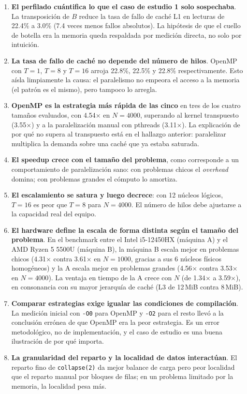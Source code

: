 \begin{enumerate}
    \item \textbf{El perfilado cuántifica lo que el caso de estudio 1 solo sospechaba}. La transposición de $B$ reduce la tasa de fallo de caché L1 en lecturas de 22.4\% a 3.0\% (7.4 veces menos fallos absolutos). La hipótesis de que el cuello de botella era la memoria queda respaldada por medición directa, no solo por intuición.

    \item \textbf{La tasa de fallo de caché no depende del número de hilos}. OpenMP con $T=1$, $T=8$ y $T=16$ arroja 22.8\%, 22.5\% y 22.8\% respectivamente. Esto aísla limpiamente la causa: el paralelismo no empeora el acceso a la memoria (el patrón es el mismo), pero tampoco lo arregla.

    \item \textbf{OpenMP es la estrategia más rápida de las cinco} en tres de los cuatro tamaños evaluados, con 4.54$\times$ en $N=4000$, superando al kernel transpuesto (3.55$\times$) y a la paralelización manual con pthreads (3.11$\times$). La explicación de por qué no supera al transpuesto está en el hallazgo anterior: paralelizar multiplica la demanda sobre una caché que ya estaba saturada.

    \item \textbf{El speedup crece con el tamaño del problema}, como corresponde a un comportamiento de paralelización sano: con problemas chicos el \emph{overhead} domina; con problemas grandes el cómputo lo amortiza.

    \item \textbf{El escalamiento se satura y luego decrece}: con 12 núcleos lógicos, $T=16$ es peor que $T=8$ para $N=4000$. El número de hilos debe ajustarse a la capacidad real del equipo.

    \item \textbf{El hardware define la escala de forma distinta según el tamaño del problema}. En el benchmark entre el Intel i5-12450HX (máquina A) y el AMD Ryzen 5 5500U (máquina B), la máquina B escala mejor en problemas chicos (4.31$\times$ contra 3.61$\times$ en $N=1000$, gracias a sus 6 núcleos físicos homogéneos) y la A escala mejor en problemas grandes (4.56$\times$ contra 3.53$\times$ en $N=4000$). La ventaja en tiempo de la A crece con $N$ (de 1.34$\times$ a 3.59$\times$), en consonancia con su mayor jerarquía de caché (L3 de 12\,MiB contra 8\,MiB).

    \item \textbf{Comparar estrategias exige igualar las condiciones de compilación}. La medición inicial con \texttt{-O0} para OpenMP y \texttt{-O2} para el resto llevó a la conclusión errónea de que OpenMP era la peor estrategia. Es un error metodológico, no de implementación, y el caso de estudio es una buena ilustración de por qué importa.

    \item \textbf{La granularidad del reparto y la localidad de datos interactúan}. El reparto fino de \texttt{collapse(2)} da mejor balance de carga pero peor localidad que el reparto manual por bloques de filas; en un problema limitado por la memoria, la localidad pesa más.
\end{enumerate}

